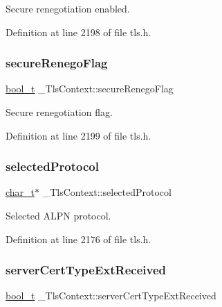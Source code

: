 Secure renegotiation enabled. 



Definition at line 2198 of file tls.\+h.

\mbox{\label{struct__TlsContext_a58218856798a20ca0406216f62970576}} 
\subsubsection{\texorpdfstring{secure\+Renego\+Flag}{secureRenegoFlag}}
{\footnotesize\ttfamily \hyperlink{compiler__port_8h_a812d16e5494522586b3784e55d479912}{bool\+\_\+t} \+\_\+\+Tls\+Context\+::secure\+Renego\+Flag}



Secure renegotiation flag. 



Definition at line 2199 of file tls.\+h.

\mbox{\label{struct__TlsContext_aa3dc99b8cf7df618861aa2a052e0bad9}} 
\subsubsection{\texorpdfstring{selected\+Protocol}{selectedProtocol}}
{\footnotesize\ttfamily \hyperlink{compiler__port_8h_a40bb5262bf908c328fbcfbe5d29d0201}{char\+\_\+t}$\ast$ \+\_\+\+Tls\+Context\+::selected\+Protocol}



Selected A\+L\+PN protocol. 



Definition at line 2176 of file tls.\+h.

\mbox{\label{struct__TlsContext_a1bcf3cad648df615d0b4e5d0f36c1bc4}} 
\subsubsection{\texorpdfstring{server\+Cert\+Type\+Ext\+Received}{serverCertTypeExtReceived}}
{\footnotesize\ttfamily \hyperlink{compiler__port_8h_a812d16e5494522586b3784e55d479912}{bool\+\_\+t} \+\_\+\+Tls\+Context\+::server\+Cert\+Type\+Ext\+Received}



